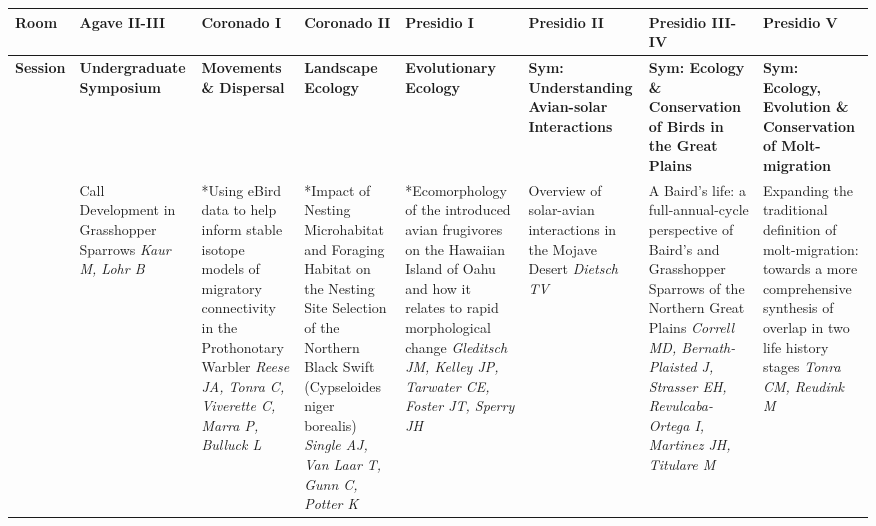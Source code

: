 \begin{tabular}{|x{0.85cm}|a{2.85cm}|x{2.85cm}|x{2.85cm}|x{2.85cm}|a{2.85cm}|a{2.85cm}|a{2.85cm}|}\hline
Room & Agave II-III & Coronado I & Coronado II & Presidio I & Presidio II & Presidio III-IV & Presidio V\\
\hline
\rule{0pt}{1em} \textbf{Session} &\footnotesize \textbf{Undergraduate Symposium} & \footnotesize \textbf{Movements \& Dispersal} & \footnotesize \textbf{Landscape Ecology} & \footnotesize \textbf{Evolutionary Ecology} & \footnotesize \textbf{Sym: Understanding Avian-solar Interactions} & \footnotesize \textbf{Sym: Ecology \& Conservation of Birds in the Great Plains} & \footnotesize \textbf{Sym: Ecology, Evolution \& Conservation of Molt-migration}\\
\hline
{}&Call Development in Grasshopper Sparrows \newline \newline \textit{Kaur M, Lohr B} & *Using eBird data to help inform stable isotope models of migratory connectivity in the Prothonotary Warbler \newline \newline \textit{Reese JA, Tonra C, Viverette C, Marra P, Bulluck L} & *Impact of Nesting Microhabitat and Foraging Habitat on the Nesting Site Selection of the Northern Black Swift (Cypseloides niger borealis) \newline \newline \textit{Single AJ, Van Laar T, Gunn C, Potter K} & *Ecomorphology of the introduced avian frugivores on the Hawaiian Island of Oahu and how it relates to rapid morphological change \newline \newline \textit{Gleditsch JM, Kelley JP, Tarwater CE, Foster JT, Sperry JH} & Overview of solar-avian interactions in the Mojave Desert \newline \newline \textit{Dietsch TV} & A Baird's life: a full-annual-cycle perspective of Baird's and Grasshopper Sparrows of the Northern Great Plains \newline \newline \textit{Correll MD, Bernath-Plaisted J, Strasser EH, Revulcaba-Ortega I, Martinez JH, Titulare M} & Expanding the traditional definition of molt-migration: towards a more comprehensive synthesis of overlap in two life history stages \newline \newline \textit{Tonra CM, Reudink M}\\

\end{tabular}
